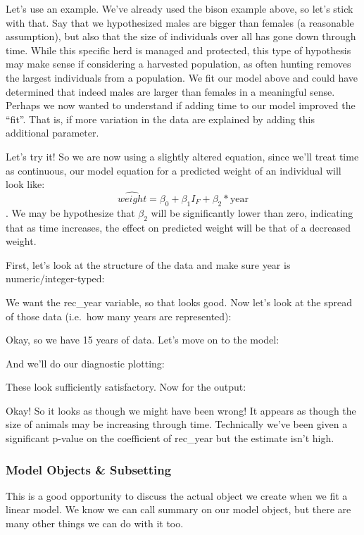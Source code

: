\documentclass[
]{article}
\begin{document}
Let's use an example. We've already used the bison example above, so
let's stick with that. Say that we hypothesized males are bigger than
females (a reasonable assumption), but also that the size of individuals
over all has gone down through time. While this specific herd is managed
and protected, this type of hypothesis may make sense if considering a
harvested population, as often hunting removes the largest individuals
from a population. We fit our model above and could have determined that
indeed males are larger than females in a meaningful sense. Perhaps we
now wanted to understand if adding time to our model improved the
``fit''. That is, if more variation in the data are explained by adding
this additional parameter.

Let's try it! So we are now using a slightly altered equation, since
we'll treat time as continuous, our model equation for a predicted
weight of an individual will look like:
\[\widehat{weight} = \beta_0 + \beta_1 I_F + \beta_2*\text{year}\]. We
may be hypothesize that \(\beta_2\) will be significantly lower than
zero, indicating that as time increases, the effect on predicted weight
will be that of a decreased weight.

First, let's look at the structure of the data and make sure year is
numeric/integer-typed:

We want the rec\_year variable, so that looks good. Now let's look at
the spread of those data (i.e.~how many years are represented):

Okay, so we have 15 years of data. Let's move on to the model:

And we'll do our diagnostic plotting:

These look sufficiently satisfactory. Now for the output:

Okay! So it looks as though we might have been wrong! It appears as
though the size of animals may be increasing through time. Technically
we've been given a significant p-value on the coefficient of rec\_year
but the estimate isn't high.

\hypertarget{model-objects-subsetting}{%
\subsubsection{Model Objects \&
Subsetting}\label{model-objects-subsetting}}

This is a good opportunity to discuss the actual object we create when
we fit a linear model. We know we can call summary on our model object,
but there are many other things we can do with it too.
\end{document}
